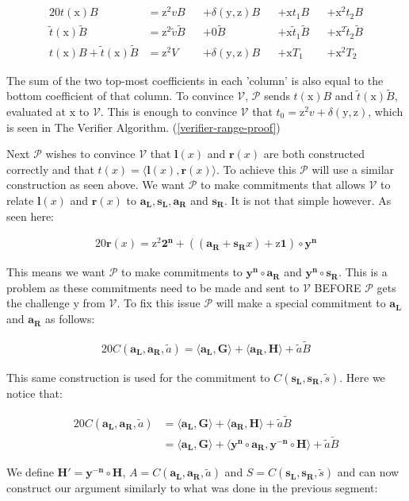 \documentclass{article}
\newcommand{\eq}[1]{\begin{alignat*}{20}#1\end{alignat*}}
\renewcommand{\vec}[1]{\boldsymbol{#1}}
\newcommand{\ran}[1]{\mathrm{#1}}
\newcommand{\vecran}[1]{\mathbf{#1}}
\newcommand{\V}{\mathcal{V}}
\renewcommand{\P}{\mathcal{P}}
\newcommand{\tB}{\widetilde{B}}
\renewcommand{\tt}{\widetilde{t}}
\newcommand{\tv}{\widetilde{v}}
\newcommand{\dotp}[2]{\langle #1, #2 \rangle}
\newcommand{\opn}[1]{\operatorname{#1}}
\newcommand{\vecl}[1]{\vec{#1_{\opn{L}}}}
\newcommand{\vecr}[1]{\vec{#1_{\opn{R}}}}
\begin{document}
\eq{
	t(\ran{x})B                   &= \ran{z^2}vB      &&+ \delta(\ran{y},\ran{z})B &&+ \ran{x}t_1B       &&+ \ran{x^2}t_2B \\
	\tt(\ran{x})\tB               &= \ran{z^2}\tv \tB &&+ 0\tB                     &&+ \ran{x} \tt_1 \tB &&+ \ran{x^2} \tt_2 \tB\\
	t(\ran{x})B + \tt(\ran{x})\tB &= \ran{z^2}V       &&+ \delta(\ran{y},\ran{z})B &&+ \ran{x}T_1        &&+ \ran{x^2}T_2
}

The sum of the two top-most coefficients in each 'column' is also
equal to the bottom coefficient of that column. To convince $\V$, $\P$
sends $t(\ran{x})B$ and $\tt(\ran{x})\tB$, evaluated at $\ran{x}$
to $\V$. This is enough to convince $\V$ that $t_0 = \ran{z^2}v +
\delta(\ran{y},\ran{z})$, which is seen in The Verifier Algorithm.
(\ref{verifier-range-proof})

Next $\P$ wishes to convince $\V$ that $\vec{l}(x)$ and
$\vec{r}(x)$ are both constructed correctly and that $t(x) =
\dotp{\vec{l}(x)}{\vec{r}(x)}$. To achieve this $\P$ will use a similar
construction as seen above. We want $\P$ to make commitments that allows
$\V$ to relate $\vec{l}(x)$ and $\vec{r}(x)$ to $\vecl{a}, \vecl{s},
\vecr{a}$ and $\vecr{s}$. It is not that simple however. As seen here:

\eq{
	\vec{r}(x) = \ran{z^2}\vec{2^n} + ((\vecr{a} + \vecr{s}x) + \ran{z}\vec{1})\circ\vecran{y^n}
}

This means we want $\P$ to make commitments to $\vec{y^n}\circ \vecr{a}$ and $\vec{y^n}\circ\vecr{s}$. This is a problem as these commitments need to be made and sent to $\V$ BEFORE $\P$ gets the challenge $\ran{y}$ from $\V$. To fix this issue $\P$ will make a special commitment to $\vecl{a}$ and $\vecr{a}$ as follows:

\eq{
	C(\vecl{a}, \vecr{a}, \widetilde{a}) = \dotp{\vecl{a}}{\vec{G}} + \dotp{\vecr{a}}{\vec{H}} + \widetilde{a}\tB
}

This same construction is used for the commitment to $C(\vecl{s},
\vecr{s}, \widetilde{s})$. Here we notice that:

\eq{
	C(\vecl{a}, \vecr{a}, \widetilde{a}) &= \dotp{\vecl{a}}{\vec{G}} + \dotp{\vecr{a}}{\vec{H}} + \widetilde{a}\tB \\
	&= \dotp{\vecl{a}}{\vec{G}} + \dotp{\vecran{y^n}\circ \vecr{a}}{\vecran{y^{-n}}\circ \vec{H}} + \widetilde{a}\tB
}

We define $\vec{H'} = \vecran{y^{-n}}\circ\vec{H}$, $A = C(\vecl{a},\vecr{a}, \widetilde{a})$ and $S = C(\vecl{s}, \vecr{s}, \widetilde{s})$ and can now construct our argument similarly to what was done in the previous segment:
\end{document}
